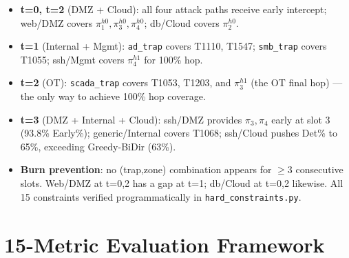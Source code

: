 \documentclass[12pt,a4paper]{article}
\begin{document}
\begin{itemize}[leftmargin=*, noitemsep]
  \item \textbf{t=0, t=2} (DMZ + Cloud): all four attack paths receive early intercept;
        web/DMZ covers $\pi_1^{h0},\pi_3^{h0},\pi_4^{h0}$; db/Cloud covers $\pi_2^{h0}$.
  \item \textbf{t=1} (Internal + Mgmt): \texttt{ad\_trap} covers T1110, T1547;
        \texttt{smb\_trap} covers T1055; ssh/Mgmt covers $\pi_4^{h1}$ for 100\% hop.
  \item \textbf{t=2} (OT): \texttt{scada\_trap} covers T1053, T1203, and $\pi_3^{h1}$
        (the OT final hop) — the only way to achieve 100\% hop coverage.
  \item \textbf{t=3} (DMZ + Internal + Cloud): ssh/DMZ provides $\pi_3,\pi_4$ early at
        slot 3 (93.8\% Early\%); generic/Internal covers T1068; ssh/Cloud pushes Det\%
        to 65\%, exceeding Greedy-BiDir (63\%).
  \item \textbf{Burn prevention}: no (trap,zone) combination appears for $\ge 3$
        consecutive slots. Web/DMZ at t=0,2 has a gap at t=1; db/Cloud at t=0,2 likewise.
        All 15 constraints verified programmatically in \texttt{hard\_constraints.py}.
\end{itemize}

\section{15-Metric Evaluation Framework}
\label{sec:metrics}
\end{document}
